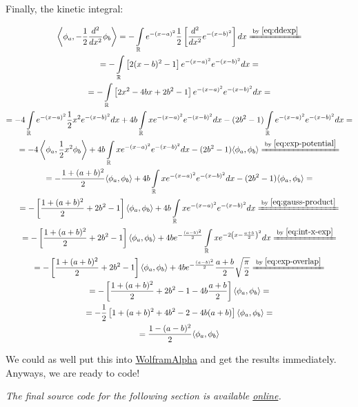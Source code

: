 \documentclass{article}
\newcommand{\githubrepo}{https://github.com/lisyarus/chembook}
\newcommand{\codeonline}[1]{\textit{The final source code for the following section is available \href{\githubrepo/blob/master/code/#1}{online}.}}
\newcommand{\equalby}[1]{\xlongequal{\text{by }\eqref{#1}}}
\newcommand{\intR}{\int\limits_\mathbb R}
\begin{document}
Finally, the kinetic integral:

\begin{equation} \label{eq:exp-kinetic}
\begin{gathered}
\left\langle \phi_a , -\frac{1}{2} \frac{d^2}{dx^2} \phi_b \right\rangle = -\intR e^{-(x-a)^2} \frac{1}{2} \left[ \frac{d^2}{dx^2} e^{-(x-b)^2} \right] dx \equalby{eq:ddexp} \\
= -\intR \left[ 2(x-b)^2 -1 \right] e^{-(x-a)^2} e^{-(x-b)^2} dx = \\
= -\intR \left[ 2x^2 - 4bx + 2b^2-1 \right] e^{-(x-a)^2} e^{-(x-b)^2} dx = \\
= - 4 \intR e^{-(x-a)^2} \frac{1}{2} x^2 e^{-(x-b)^2} dx + 4b \intR x e^{-(x-a)^2} e^{-(x-b)^2} dx - (2b^2-1) \intR e^{-(x-a)^2} e^{-(x-b)^2} dx = \\
= - 4 \left\langle \phi_a, \frac{1}{2} x^2 \phi_b \right\rangle + 4b \intR x e^{-(x-a)^2} e^{-(x-b)^2} dx - (2b^2-1) \langle \phi_a, \phi_b \rangle \equalby{eq:exp-potential} \\
= - \frac{1+(a+b)^2}{2} \langle \phi_a, \phi_b \rangle + 4b \intR x e^{-(x-a)^2} e^{-(x-b)^2} dx - (2b^2-1) \langle \phi_a, \phi_b \rangle = \\
= - \left[\frac{1+(a+b)^2}{2} + 2b^2 - 1\right] \langle \phi_a, \phi_b \rangle + 4b \intR x e^{-(x-a)^2} e^{-(x-b)^2} dx \equalby{eq:gauss-product} \\
= - \left[\frac{1+(a+b)^2}{2} + 2b^2 - 1\right] \langle \phi_a, \phi_b \rangle + 4b e^{-\frac{(a-b)^2}{2}} \intR x e^{-2\left(x-\frac{a+b}{2}\right)^2} dx \equalby{eq:int-x-exp} \\
= - \left[\frac{1+(a+b)^2}{2} + 2b^2 - 1\right] \langle \phi_a, \phi_b \rangle + 4b e^{-\frac{(a-b)^2}{2}} \frac{a+b}{2} \sqrt\frac{\pi}{2} \equalby{eq:exp-overlap} \\
= - \left[\frac{1+(a+b)^2}{2} + 2b^2 - 1 -4b\frac{a+b}{2}\right] \langle \phi_a, \phi_b \rangle = \\
= - \frac{1}{2} \left[ 1 + (a+b)^2 + 4b^2 - 2 - 4b(a+b)\right] \langle \phi_a, \phi_b \rangle = \\
= \frac{1 - (a-b)^2}{2} \langle \phi_a, \phi_b \rangle 
\end{gathered}
\end{equation}

We could as well put this into \href{https://www.wolframalpha.com/}{WolframAlpha} and get the results immediately. Anyways, we are ready to code!

\codeonline{harmonic.py}
\end{document}
